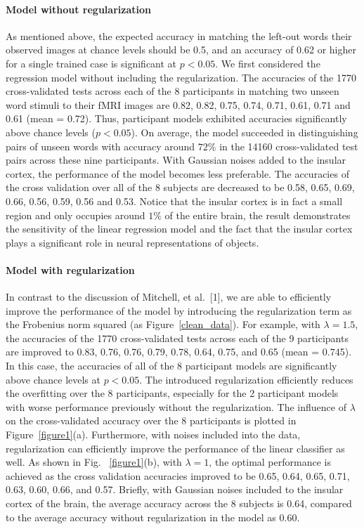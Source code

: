 \documentclass{article}
\begin{document}
\paragraph{Model without regularization}
As mentioned above, the expected accuracy in matching the left-out words their observed images at chance levels should be 0.5, and an accuracy of 0.62 or higher for a single trained case is significant at $p<0.05$. We first considered the regression model without including the regularization. The accuracies of the 1770 cross-validated tests across each of the 8 participants in matching two unseen word stimuli to their fMRI images are 0.82, 0.82, 0.75, 0.74, 0.71, 0.61, 0.71 and 0.61 (mean = 0.72). Thus,  participant models exhibited accuracies significantly above chance levels ($p<0.05$). On average, the model succeeded in distinguishing pairs of unseen words with accuracy around $72\%$ in the 14160 cross-validated test pairs across these nine participants. With Gaussian noises added to the insular cortex, the performance of the model becomes less preferable. The accuracies of the cross validation over all of the 8 subjects are decreased to be 0.58, 0.65, 0.69, 0.66, 0.56, 0.59, 0.56 and 0.53. Notice that the insular cortex is in fact a small region and only occupies around $1\%$ of the entire brain, the result demonstrates the sensitivity of the linear regression model and the fact that the insular cortex plays a significant role in neural representations of objects.

\paragraph{Model with regularization}
In contrast to the discussion of Mitchell, et al.\ [1], we are able to efficiently improve the performance of the model by introducing the regularization term as the Frobenius norm squared (as Figure~\ref{clean_data}). For example, with $\lambda=1.5$, the accuracies of the 1770 cross-validated tests across each of the 9 participants are improved to 0.83, 0.76, 0.76, 0.79, 0.78, 0.64, 0.75, and 0.65 (mean = 0.745). In this case, the accuracies of all of the 8 participant models are significantly above chance levels at $p<0.05$. The introduced regularization efficiently reduces the overfitting over the 8 participants, especially for the 2 participant models with worse performance previously without the regularization. The influence of $\lambda$ on the cross-validated accuracy over the 8 participants is plotted in Figure~\ref{figure1}(a). 
Furthermore, with noises included into the data, regularization can efficiently improve the performance of the linear classifier as well. As shown in Fig. ~\ref{figure1}(b), with $\lambda=1$, the optimal performance is achieved as the cross validation accuracies improved to be 0.65, 0.64, 0.65, 0.71, 0.63, 0.60, 0.66, and 0.57. Briefly, with Gaussian noises included to the insular cortex of the brain, the average accuracy across the 8 subjects is 0.64, compared to the average accuracy without regularization in the model as 0.60. 
\end{document}

